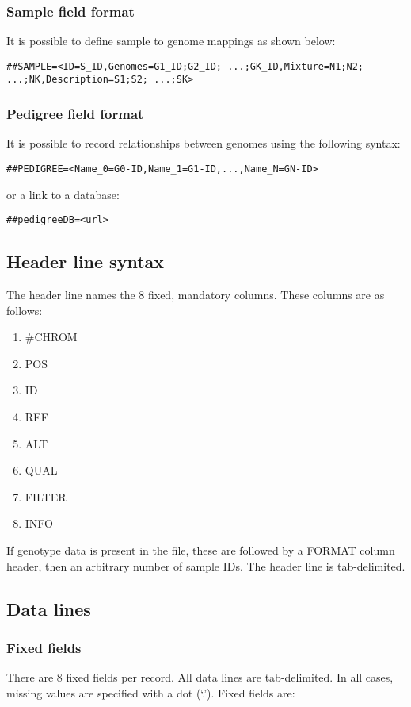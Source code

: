 \documentclass[8pt]{article}
\begin{document}
\subsubsection{Sample field format}
It is possible to define sample to genome mappings as shown below:
\small
\begin{verbatim}
##SAMPLE=<ID=S_ID,Genomes=G1_ID;G2_ID; ...;GK_ID,Mixture=N1;N2; ...;NK,Description=S1;S2; ...;SK>
\end{verbatim}
\normalsize
\subsubsection{Pedigree field format}
It is possible to record relationships between genomes using the following syntax:
\begin{verbatim}
##PEDIGREE=<Name_0=G0-ID,Name_1=G1-ID,...,Name_N=GN-ID>
\end{verbatim}
or a link to a database:
\begin{verbatim}
##pedigreeDB=<url>
\end{verbatim}
\subsection{Header line syntax}
The header line names the 8 fixed, mandatory columns. These columns are as follows:

\begin{enumerate}
  \item \#CHROM
  \item POS
  \item ID
  \item REF
  \item ALT
  \item QUAL
  \item FILTER
  \item INFO
\end{enumerate}

If genotype data is present in the file, these are followed by a FORMAT column header, then an arbitrary number of sample IDs. The header line is tab-delimited.

\subsection{Data lines}
\subsubsection{Fixed fields}
There are 8 fixed fields per record. All data lines are tab-delimited. In all cases, missing values are specified with a dot (`.'). Fixed fields are:
\end{document}

